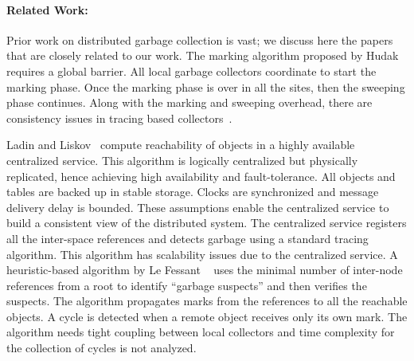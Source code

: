 \paragraph{Related Work:}
Prior work on distributed garbage collection is vast; we discuss here the papers that are closely related to our work.  %
The marking algorithm proposed by Hudak~\cite{Hudak:1982} requires a global barrier.
All local garbage
collectors coordinate to start the marking phase. Once the marking phase is over
in all the sites, then the sweeping phase continues. Along with the marking and sweeping overhead,
there are consistency issues in tracing based collectors~\cite{shapiro95}.

Ladin and Liskov~\cite{Ladin} compute reachability of objects in a highly
available centralized service. This algorithm is logically centralized but
physically replicated, hence achieving high availability and fault-tolerance.
All objects and tables are backed up in stable storage. Clocks are synchronized
and message delivery delay is bounded. These assumptions enable the centralized
service to build a consistent view of the distributed system. The centralized
service registers all the inter-space references and detects garbage using a standard
tracing algorithm. This algorithm has scalability issues due to the centralized
service. A heuristic-based algorithm by Le Fessant ~\cite{LeFessant} uses the minimal number
of inter-node references from a root to identify ``garbage suspects'' and then
verifies the suspects. The algorithm propagates marks from the references to all the
reachable objects. A cycle is detected when a remote object receives only its
own mark. The algorithm needs tight coupling between local
collectors and time complexity for the collection of cycles is not analyzed.

